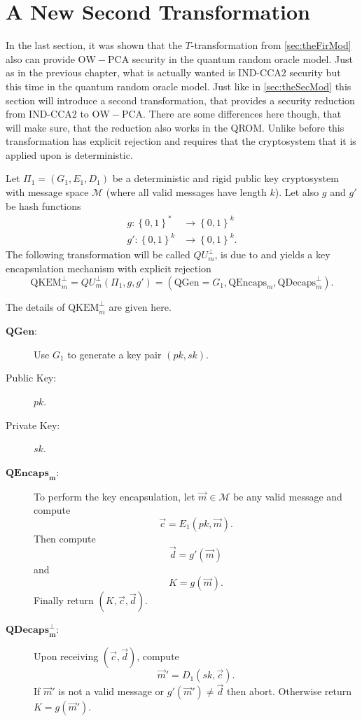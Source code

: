 \section{A New Second Transformation}
\label{sec:aNewSecTra}

In the last section, it was shown that the $T$-transformation from \cref{sec:theFirMod} also can provide $\mathrm{OW-PCA}$ security in the quantum random oracle model. Just as in the previous chapter, what is actually wanted is IND-$\mathrm{CCA}2$ security but this time in the quantum random oracle model. Just like in \cref{sec:theSecMod} this section will introduce a second transformation, that provides a security reduction from IND-$\mathrm{CCA}2$ to $\mathrm{OW-PCA}$. There are some differences here though, that will make sure, that the reduction also works in the QROM. Unlike before this transformation has explicit rejection and requires that the cryptosystem that it is applied upon is deterministic.

Let $\Pi_1 = \left(G_1, E_1, D_1\right)$ be a deterministic and rigid public key cryptosystem with message space $\mathcal{M}$ (where all valid messages have length $k$). Let also $g$ and $g'$ be hash functions
\begin{align*}
	g : \left\{ 0,1 \right\}^{*} &\rightarrow \left\{ 0,1 \right\}^k\\
	g': \left\{ 0,1 \right\}^k &\rightarrow \left\{ 0,1 \right\}^k.
\end{align*}
The following transformation will be called $QU^{\bot}_{m}$, is due to \cite{HHK} and yields a key encapsulation mechanism with explicit rejection
\[
	\mathrm{QKEM}^{\bot}_m = QU^{\bot}_m \left(\Pi_1, g, g'\right) = \left(\mathrm{QGen} = G_1, \mathrm{QEncaps}_m, \mathrm{QDecaps}^{\bot}_m\right).
\]

The details of $\mathrm{QKEM}^{\bot}_m$ are given here.
\begin{description}
	\item[$\mathrm{\mathbf{QGen}}$:] Use $G_1$ to generate a key pair $\left(pk,sk\right)$.
	\item[Public Key:] $pk$.
	\item[Private Key:] $sk$.
	\item[$\mathrm{\mathbf{QEncaps}}_{\boldsymbol{m}}$:] To perform the key encapsulation, let $\vec{m} \in \mathcal{M}$ be any valid message and compute
		\[
			\vec{c} = E_1\left(pk, \vec{m}\right).
		\]
		Then compute
		\[
			\vec{d} = g'\left(\vec{m}\right)
		\]
		and
		\[
			K = g\left(\vec{m}\right).
		\]
		Finally return $\left(K, \vec{c}, \vec{d}\right)$.
	\item[$\mathrm{\mathbf{QDecaps}}^{\mathbf{\bot}}_{\boldsymbol{m}}$:] Upon receiving $(\vec{c}, \vec{d})$, compute
		\[
			\vec{m}' = D_1\left(sk, \vec{c}\right).
		\]
		If $\vec{m}'$ is not a valid message or $g'\left(\vec{m}'\right) \neq \vec{d}$ then abort. Otherwise return $K = g\left(\vec{m}'\right)$.
\end{description}



